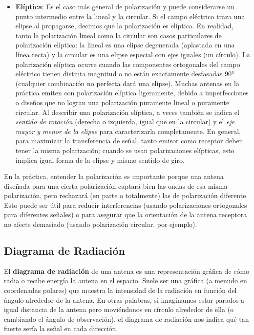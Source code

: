 \begin{itemize}
    \item \textbf{Elíptica}: Es el caso más general de polarización y puede considerarse un punto intermedio entre la lineal y la circular. Si el campo eléctrico traza una elipse al propagarse, decimos que la polarización es elíptica. En realidad, tanto la polarización lineal como la circular son casos particulares de polarización elíptica: la lineal es una elipse degenerada (aplastada en una línea recta) y la circular es una elipse especial con ejes iguales (un círculo). La polarización elíptica ocurre cuando las componentes ortogonales del campo eléctrico tienen distinta magnitud o no están exactamente desfasadas 90° (cualquier combinación no perfecta dará una elipse). Muchas antenas en la práctica emiten con polarización elíptica ligeramente, debido a imperfecciones o diseños que no logran una polarización puramente lineal o puramente circular. Al describir una polarización elíptica, a veces también se indica el \textit{sentido de rotación} (derecha o izquierda, igual que en la circular) y el \textit{eje mayor y menor de la elipse} para caracterizarla completamente. En general, para maximizar la transferencia de señal, tanto emisor como receptor deben tener la misma polarización; cuando se usan polarizaciones elípticas, esto implica igual forma de la elipse y mismo sentido de giro.\\
\end{itemize}

En la práctica, entender la polarización es importante porque una antena diseñada para una cierta polarización captará bien las ondas de esa misma polarización, pero rechazará (en parte o totalmente) las de polarización diferente. Esto puede ser útil para reducir interferencias (usando polarizaciones ortogonales para diferentes señales) o para asegurar que la orientación de la antena receptora no afecte demasiado (usando polarización circular, por ejemplo).

\subsection{Diagrama de Radiación}

El \textbf{diagrama de radiación} de una antena es una representación gráfica de cómo radia o recibe energía la antena en el espacio. Suele ser una gráfica (a menudo en coordenadas polares) que muestra la intensidad de la radiación en función del ángulo alrededor de la antena. En otras palabras, si imaginamos estar parados a igual distancia de la antena pero moviéndonos en círculo alrededor de ella (o cambiando el ángulo de observación), el diagrama de radiación nos indica qué tan fuerte sería la señal en cada dirección.\\

